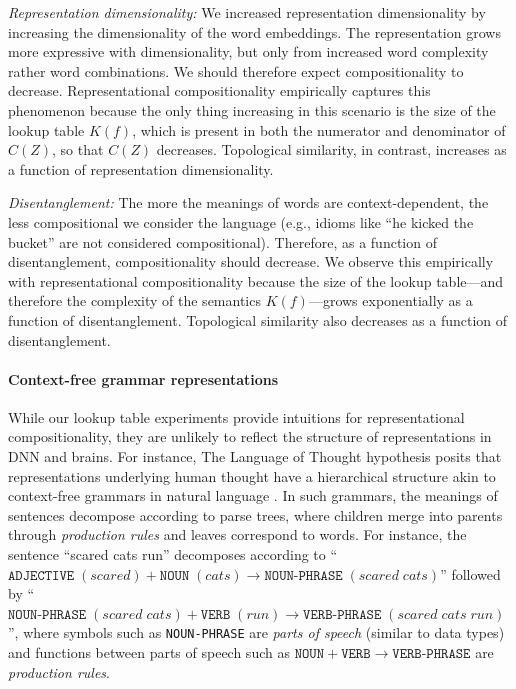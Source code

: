 \documentclass{article} %
\newcommand{\comp}{representational compositionality}
\newcommand{\Comp}{Representational compositionality}
\begin{document}
\textit{Representation dimensionality:} We increased representation dimensionality by increasing the dimensionality of the word embeddings. The representation grows more expressive with dimensionality, but only from increased word complexity rather word combinations. We should therefore expect compositionality to decrease. \Comp{} empirically captures this phenomenon because the only thing increasing in this scenario is the size of the lookup table $K(f)$, which is present in both the numerator and denominator of $C(Z)$, so that $C(Z)$ decreases. Topological similarity, in contrast, increases as a function of representation dimensionality.


\textit{Disentanglement:} The more the meanings of words are context-dependent, the less compositional we consider the language (e.g., idioms like ``he kicked the bucket'' are not considered compositional). Therefore, as a function of disentanglement, compositionality should decrease. We observe this empirically with \comp{} because the size of the lookup table---and therefore the complexity of the semantics $K(f)$---grows exponentially as a function of disentanglement. Topological similarity also decreases as a function of disentanglement.

\paragraph{Context-free grammar representations} 

While our lookup table experiments provide intuitions for \comp{}, they are unlikely to reflect the structure of representations in DNN and brains. For instance, The Language of Thought hypothesis \citep{fodor1975language} posits that representations underlying human thought have a hierarchical structure akin to context-free grammars in natural language \citep{chomsky1956three}. In such grammars, the meanings of sentences decompose according to parse trees, where children merge into parents through \emph{production rules} and leaves correspond to words. For instance, the sentence ``scared cats run'' decomposes according to ``$\texttt{ADJECTIVE} \; (scared) + \texttt{NOUN} \; (cats) \rightarrow \texttt{NOUN-PHRASE} \; (scared \; cats)$'' followed by ``$\texttt{NOUN-PHRASE} \; (scared \; cats) + \texttt{VERB} \; (run) \rightarrow \texttt{VERB-PHRASE} \; (scared \; cats \; run)$'', where symbols such as \texttt{NOUN-PHRASE} are \emph{parts of speech} (similar to data types) and functions between parts of speech such as $\texttt{NOUN} + \texttt{VERB} \rightarrow \texttt{VERB-PHRASE}$ are \emph{production rules}.
\end{document}
